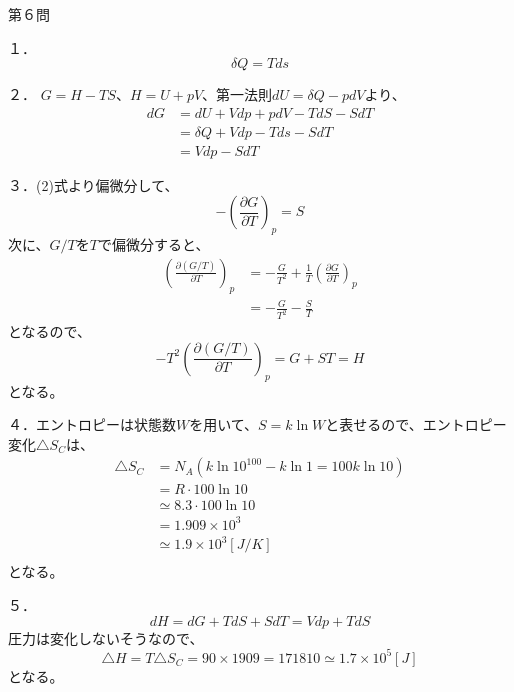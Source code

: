 \documentclass[fleqn]{jbook}
\begin{document}
\begin{answer}{第６問}{}



１．
　\begin{equation}
  　　\delta Q = T ds
　\end{equation}


２．
  $G = H - TS$、$H = U + pV$、第一法則$dU = \delta Q - pdV$より、
　\begin{align}
  　　dG &= dU + Vdp + pdV - TdS - SdT \\ 
         &= \delta Q + Vdp - Tds - SdT \\
         &= Vdp - SdT
　\end{align}


３．(2)式より偏微分して、
　\begin{equation}
  　　-( \frac{\partial G}{\partial T} )_p = S
　\end{equation}
次に、$G/T$を$T$で偏微分すると、
　\begin{align}
  　　(\frac{\partial (G /T)}{\partial T})_p &= -\frac{G}{T^2} + \frac{1}{T}( \frac{\partial G}{\partial T} )_p \\
                                           &= -\frac{G}{T^2} - \frac{S}{T} 
　\end{align}
となるので、
　\begin{equation}
  　　-T^2 (\frac{\partial (G /T)}{\partial T})_p = G + ST = H  
　\end{equation}
となる。



４．エントロピーは状態数$W$を用いて、$S = k \ln W$と表せるので、エントロピー変化$\triangle S_C$は、
　\begin{align}
  　　\triangle S_C &= N_A(k \ln 10^{100} - k \ln 1 = 100 k \ln 10 ) \\
                    &= R \cdot 100\ln 10 \\
                    &\simeq 8.3 \cdot 100\ln 10 \\
                    &= 1.909 \times 10^3 \\
                    &\simeq 1.9 \times 10^3 [J/K]\\ 
　\end{align}
となる。


５．
　\begin{equation}
  　　dH = dG + TdS + SdT = Vdp + TdS
　\end{equation}
圧力は変化しないそうなので、
　\begin{equation}
  　　\triangle H=T \triangle S_C = 90 \times 1909 = 171810 \simeq 1.7 \times 10^5 [J] 
　\end{equation}
となる。

\end{answer}
\end{document}
